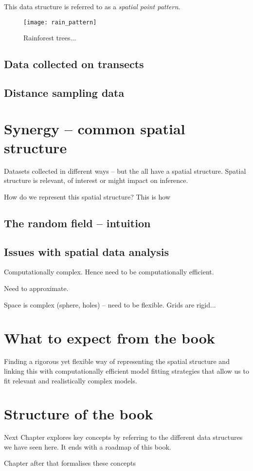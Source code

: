 This data structure is referred to as a \textit{spatial point pattern}.
\begin{figure}
\centering
\texttt{[image: rain\_pattern]}
\caption{\label{fig:rainpattern} Rainforest trees...}
\end{figure}




\subsection{Data collected on transects}
\subsection{Distance sampling data}


\section{Synergy -- common spatial structure}
Datasets collected in different ways -- but the all have 
a spatial structure. Spatial structure is relevant, of interest or might impact on inference.

How do we represent this spatial structure? This is how 

\subsection{The random field -- intuition}



\subsection{Issues with spatial data analysis}

Computationally complex. Hence need to be computationally efficient.

Need to approximate.

Space is complex (sphere, holes) -- need to be flexible. Grids are rigid... 

\section{What to expect from the book}


Finding a rigorous yet flexible way of representing the spatial structure and linking this with computationally efficient model fitting strategies that allow us to fit relevant and realistically complex models.

\section{Structure of the book}

Next Chapter explores key concepts by referring to the different data structures we have seen here. It ends with a roadmap of this book.
 
Chapter after that formalises these concepts



